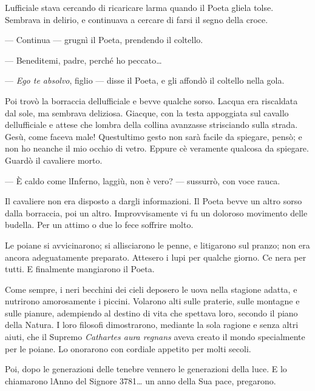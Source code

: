 L\textquotesingle ufficiale stava cercando di ricaricare
l\textquotesingle arma quando il Poeta gliela tolse. Sembrava in
delirio, e continuava a cercare di farsi il segno della croce.

--- Continua --- grugnì il Poeta, prendendo il coltello.

--- Beneditemi, padre, perché ho peccato\ldots{}

--- \emph{Ego te absolvo}, figlio --- disse il Poeta, e gli affondò il
coltello nella gola.

Poi trovò la borraccia dell\textquotesingle ufficiale e bevve qualche
sorso. L\textquotesingle acqua era riscaldata dal sole, ma sembrava
deliziosa. Giacque, con la testa appoggiata sul cavallo
dell\textquotesingle ufficiale e attese che l\textquotesingle ombra
della collina avanzasse strisciando sulla strada. Gesù, come faceva
male! Quest\textquotesingle ultimo gesto non sarà facile da spiegare,
pensò; e non ho neanche il mio occhio di vetro. Eppure
c\textquotesingle è veramente qualcosa da spiegare. Guardò il cavaliere
morto.

--- È caldo come l\textquotesingle Inferno, laggiù, non è vero? ---
sussurrò, con voce rauca.

Il cavaliere non era disposto a dargli informazioni. Il Poeta bevve un
altro sorso dalla borraccia, poi un altro. Improvvisamente vi fu un
doloroso movimento delle budella. Per un attimo o due lo fece soffrire
molto.

Le poiane si avvicinarono; si allisciarono le penne, e litigarono sul
pranzo; non era ancora adeguatamente preparato. Attesero i lupi per
qualche giorno. Ce n\textquotesingle era per tutti. E finalmente
mangiarono il Poeta.

Come sempre, i neri becchini dei cieli deposero le uova nella stagione
adatta, e nutrirono amorosamente i piccini. Volarono alti sulle
praterie, sulle montagne e sulle pianure, adempiendo al destino di vita
che spettava loro, secondo il piano della Natura. I loro filosofi
dimostrarono, mediante la sola ragione e senza altri aiuti, che il
Supremo \emph{Cathartes aura regnans} aveva creato il mondo specialmente
per le poiane. Lo onorarono con cordiale appetito per molti secoli.

Poi, dopo le generazioni delle tenebre vennero le generazioni della
luce. E lo chiamarono l\textquotesingle Anno del Signore 3781\ldots{} un
anno della Sua pace, pregarono.
